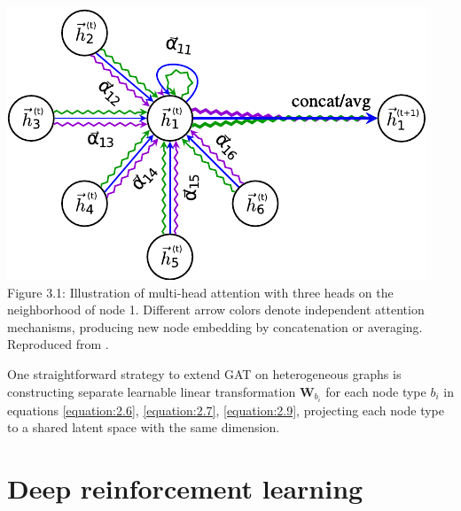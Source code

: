 \begin{center}
    \includegraphics[width=0.7\linewidth]{images/graph_attention_network_pdfa.pdf}\\
    Figure 3.1: Illustration of multi-head attention with three heads on the neighborhood of node 1. Different arrow colors denote independent attention mechanisms, producing new node embedding by concatenation or averaging. Reproduced from \cite{veličković2018graph}.
\end{center}
One straightforward strategy to extend GAT on heterogeneous graphs is constructing separate learnable linear transformation $\boldsymbol{W}_{b_i}$ for each node type $b_i$ in equations \ref{equation:2.6}, \ref{equation:2.7}, \ref{equation:2.9}, projecting each node type to a shared latent space with the same dimension.

\section{Deep reinforcement learning}

